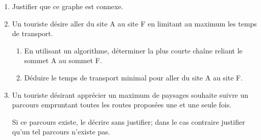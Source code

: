 \begin{enumerate}
     \item
     Justifier que ce graphe est connexe.
     \item
     Un touriste désire aller du site A au site F en limitant au maximum les temps de transport.
     \begin{enumerate}[label=\alph*.]
          \item
          En utilisant un algorithme, déterminer la plus courte chaîne reliant le sommet A au sommet F.
          \item
          Déduire le temps de transport minimal pour aller du site A au site F.
     \end{enumerate}
     \item
     Un touriste désirant apprécier un maximum de paysages souhaite suivre un parcours empruntant toutes les routes proposées une et une seule fois.
     \par
     Si ce parcours existe, le décrire sans justifier; dans le cas contraire justifier qu'un tel parcours n'existe pas.
\end{enumerate}
